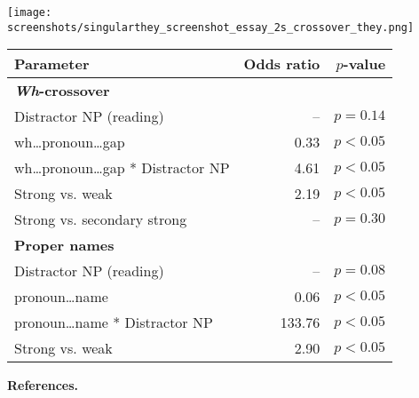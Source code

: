 \documentclass[12pt,letterpaper]{article}
\newcommand{\sectitle}[1]{\smallskip \textbf{#1.}}
\begin{document}
\begin{minipage}{\textwidth}
\centering
\texttt{[image: screenshots/singularthey\_screenshot\_essay\_2s\_crossover\_they.png]}
\vspace*{0.5em}
\label{fig:singular-they-design-paraphrase}
\end{minipage}

\vspace*{1em}
\begin{minipage}{\textwidth}
\centering
\begin{tabular}{lrr}
\toprule
Parameter & Odds ratio & $p$-value \\
\midrule
\textbf{\emph{Wh}-crossover} & & \\
Distractor NP (reading) & -- & $p = 0.14$ \\
wh\ldots{}pronoun\ldots{}gap & 0.33 & $p < 0.05$ \\
wh\ldots{}pronoun\ldots{}gap * Distractor NP & 4.61 & $p < 0.05$ \\
Strong vs. weak & 2.19 & $p < 0.05$ \\
Strong vs. secondary strong & -- & $p = 0.30$ \\
\textbf{Proper names} & & \\
Distractor NP (reading) & -- & $p = 0.08$ \\
pronoun\ldots{}name & 0.06 & $p < 0.05$ \\
pronoun\ldots{}name * Distractor NP & 133.76 & $p < 0.05$ \\
Strong vs. weak & 2.90 & $p < 0.05$ \\
\bottomrule
\end{tabular}
\vspace*{0.5em}
\label{tab:results}
\end{minipage}

\vspace*{0.4em}
\sectitle{References}

\renewcommand*{\bibfont}{\normalfont\footnotesize}
\printbibliography[heading=none]
\end{document}
